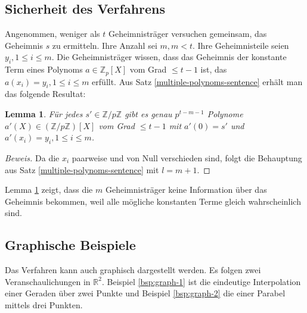\documentclass[12pt, a4paper, oneside, titlepage]{report}
\newcommand{\R}{\mathds{R}}
\newcommand{\Z}{\mathds{Z}}
\newtheorem{lemma}{Lemma}[section]
\newenvironment{bew}{\begin{proof}[Beweis]}{\end{proof}}
\theoremstyle{definition}
\begin{document}
	\subsection{Sicherheit des Verfahrens}
	
	Angenommen, weniger als $ t $ Geheimnisträger versuchen gemeinsam, das Geheimnis $ s $ zu ermitteln. Ihre Anzahl sei $ m, m < t $. Ihre Geheimnisteile seien $ y_i, 1 \leq i \leq m $. Die Geheimnisträger wissen, dass das Geheimnis der konstante Term eines Polynoms $ a \in \Z_p[X] $ vom Grad $ \leq t - 1 $ ist, das $ a(x_i) = y_i, 1 \leq i \leq m $ erfüllt. Aus Satz \ref{multiple-polynoms-sentence} erhält man das folgende Resultat:
	
	\begin{lemma}\label{lemma-multiple-possibilities}
		Für jedes $ s' \in \Z / p \Z $ gibt es genau $ p^{t-m-1} $ Polynome $ a'(X) \in (\Z / p \Z)[X] $ vom Grad $ \leq t - 1 $ mit $ a'(0) = s' $ und $ a'(x_i) = y_i, 1 \leq i \leq m $.
	\end{lemma}

	\begin{bew}
		Da die $ x_i $ paarweise und von Null verschieden sind, folgt die Behauptung aus Satz \ref{multiple-polynoms-sentence} mit $ l = m + 1 $.
	\end{bew}

	Lemma \ref{lemma-multiple-possibilities} zeigt, dass die $ m $ Geheimnisträger keine Information über das Geheimnis bekommen, weil alle mögliche konstanten Terme gleich wahrscheinlich sind.

	\subsection{Graphische Beispiele}
		Das Verfahren kann auch graphisch dargestellt werden. Es folgen zwei Veranschaulichungen in $ \R^2 $. Beispiel \ref{bsp:graph-1} ist die eindeutige Interpolation einer Geraden über zwei Punkte und Beispiel \ref{bsp:graph-2} die einer Parabel mittels drei Punkten.
\end{document}
